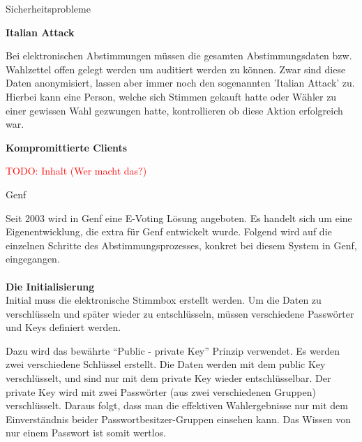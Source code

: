 \documentclass[10pt,a4paper]{article} %
\newcommand{\NewsItem}[1]{ %
\usefont{T1}{fvs}{n}{n} %
\vspace{24pt}\large #1\vspace{3pt} %
\par \normalsize \normalfont}
\newcommand{\NewsAuthor}[1]{ %
\hfill by \textsc{#1} \vspace{20pt} %
\par \normalfont}
\begin{document}
\begin{multicols}{3} %



\begin{flushleft}
\NewsItem{Sicherheitsprobleme}
\end{flushleft}

\textbf{Italian Attack}

Bei elektronischen Abstimmungen müssen die gesamten Abstimmungsdaten bzw. Wahlzettel offen gelegt werden um auditiert werden zu können. Zwar sind diese Daten anonymisiert, lassen aber immer noch den sogenannten 'Italian Attack' zu. Hierbei kann eine Person, welche sich Stimmen gekauft hatte oder Wähler zu einer gewissen Wahl gezwungen hatte, kontrollieren ob diese Aktion erfolgreich war.

\textbf{Kompromittierte Clients}

\textcolor{red}{TODO: Inhalt (Wer macht das?)}


\begin{flushleft}
\NewsItem{Genf}
\end{flushleft}

Seit 2003 wird in Genf eine E-Voting Lösung angeboten. Es handelt sich um eine Eigenentwicklung, die extra für Genf entwickelt wurde.
Folgend wird auf die einzelnen Schritte des Abstimmungsprozesses, konkret bei diesem System in Genf, eingegangen.
\\\\
\textbf{Die Initialisierung}
\\
Initial muss die elektronische Stimmbox erstellt werden.
Um die Daten zu verschlüsseln und später wieder zu entschlüsseln, müssen verschiedene Passwörter und Keys definiert werden.

Dazu wird das bewährte ``Public - private Key'' Prinzip verwendet.
Es werden zwei verschiedene Schlüssel erstellt.
Die Daten werden mit dem public Key verschlüsselt, und sind nur mit dem private Key wieder entschlüsselbar.
Der private Key wird mit zwei Passwörter (aus zwei verschiedenen Gruppen) verschlüsselt.
Daraus folgt, dass man die effektiven Wahlergebnisse nur mit dem Einverständnis beider Passwortbesitzer-Gruppen einsehen kann.
Das Wissen von nur einem Passwort ist somit wertlos.


\end{multicols}
\end{document}
